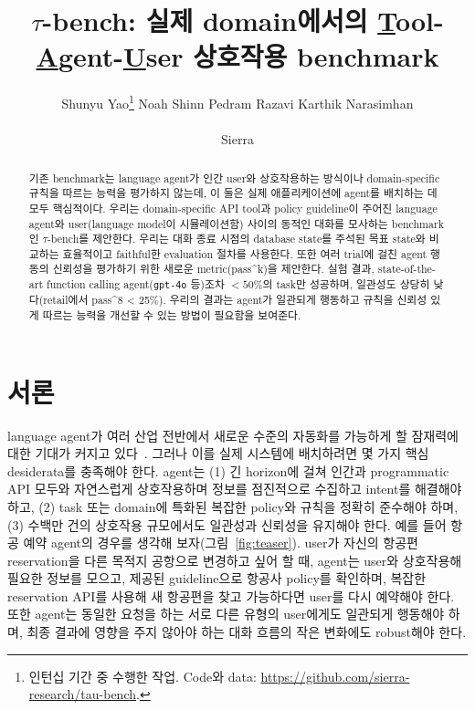 \documentclass{article}
\title{{$\tau$}-bench: 실제 domain에서의 \underline{T}ool-\underline{A}gent-\underline{U}ser 상호작용 benchmark}
\author{%
  Shunyu Yao\thanks{인턴십 기간 중 수행한 작업. Code와 data: \url{https://github.com/sierra-research/tau-bench}.} \quad  \quad  Noah Shinn \quad  \quad Pedram Razavi \quad \quad  Karthik Narasimhan\\\\\large{Sierra}}
\newcommand{\benchmark}{$\tau$-bench}
\begin{document}
\maketitle


\begin{abstract}
기존 benchmark는 language agent가 인간 user와 상호작용하는 방식이나 domain-specific 규칙을 따르는 능력을 평가하지 않는데, 이 둘은 실제 애플리케이션에 agent를 배치하는 데 모두 핵심적이다. 우리는 domain-specific API tool과 policy guideline이 주어진 language agent와 user(language model이 시뮬레이션함) 사이의 동적인 대화를 모사하는 benchmark인 \benchmark{}를 제안한다.
우리는 대화 종료 시점의 database state를 주석된 목표 state와 비교하는 효율적이고 faithful한 evaluation 절차를 사용한다. 또한 여러 trial에 걸친 agent 행동의 신뢰성을 평가하기 위한 새로운 metric(pass\textasciicircum k)을 제안한다. 실험 결과, state-of-the-art function calling agent(\texttt{gpt-4o} 등)조차 $<50\%$의 task만 성공하며, 일관성도 상당히 낮다(retail에서 pass\textasciicircum 8 < 25\%). 우리의 결과는 agent가 일관되게 행동하고 규칙을 신뢰성 있게 따르는 능력을 개선할 수 있는 방법이 필요함을 보여준다.

\end{abstract}



\section{서론}

language agent가 여러 산업 전반에서 새로운 수준의 자동화를 가능하게 할 잠재력에 대한 기대가 커지고 있다~\citep{sumers2023cognitive, yao2022react, schick2023toolformer, ahn2022can}. 그러나 이를 실제 시스템에 배치하려면 몇 가지 핵심 desiderata를 충족해야 한다. agent는 (1) 긴 horizon에 걸쳐 인간과 programmatic API 모두와 자연스럽게 상호작용하며 정보를 점진적으로 수집하고 intent를 해결해야 하고, (2) task 또는 domain에 특화된 복잡한 policy와 규칙을 정확히 준수해야 하며, (3) 수백만 건의 상호작용 규모에서도 일관성과 신뢰성을 유지해야 한다. 예를 들어 항공 예약 agent의 경우를 생각해 보자(그림~\ref{fig:teaser}). user가 자신의 항공편 reservation을 다른 목적지 공항으로 변경하고 싶어 할 때, agent는 user와 상호작용해 필요한 정보를 모으고, 제공된 guideline으로 항공사 policy를 확인하며, 복잡한 reservation API를 사용해 새 항공편을 찾고 가능하다면 user를 다시 예약해야 한다. 또한 agent는 동일한 요청을 하는 서로 다른 유형의 user에게도 일관되게 행동해야 하며, 최종 결과에 영향을 주지 않아야 하는 대화 흐름의 작은 변화에도 robust해야 한다.
\end{document}
